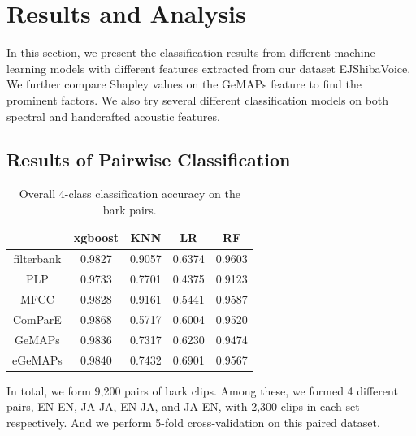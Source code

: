 \section{Results and Analysis}
\label{sec:results}

In this section, we present the classification results from different machine learning models with different features extracted from our dataset EJShibaVoice. We further compare Shapley values on the GeMAPs feature to find the prominent factors. We also try several different classification models on both spectral and handcrafted acoustic features.

\subsection{Results of Pairwise Classification}
\label{sec:main}
\begin{table}[th]
	\small
	\centering
	\begin{tabular}{l|l|c|c|c|c}
		\toprule
		\multicolumn{2}{c|}{}            & xgboost & KNN  & LR   & RF  \\
		\midrule
		\multicolumn{2}{c|}{filterbank}          & 0.9827        & 0.9057         & 0.6374    & 0.9603    \\
		\multicolumn{2}{c|}{PLP} & 0.9733 & 0.7701 & 0.4375 & 0.9123\\
		\multicolumn{2}{c|}{MFCC} & 0.9828 & 0.9161 & 0.5441 & 0.9587\\
		\multicolumn{2}{c|}{ComParE} & {0.9868} & {0.5717} & {0.6004} & {0.9520}\\
		\multicolumn{2}{c|}{GeMAPs} & 0.9836 & 0.7317 & 0.6230 & 0.9474 \\
		\multicolumn{2}{c|}{eGeMAPs} & 0.9840 & 0.7432 & 0.6901 & 0.9567\\

		\bottomrule
	\end{tabular}
	\caption{Overall 4-class classification accuracy on the bark pairs.}
	\label{table:mainresult}
\end{table}


In total, we form 9,200 pairs of bark clips. Among these, we formed 4 different pairs, EN-EN, JA-JA, EN-JA, and JA-EN, with 2,300 clips in each set respectively.  
And we perform 5-fold cross-validation on this paired dataset. 

